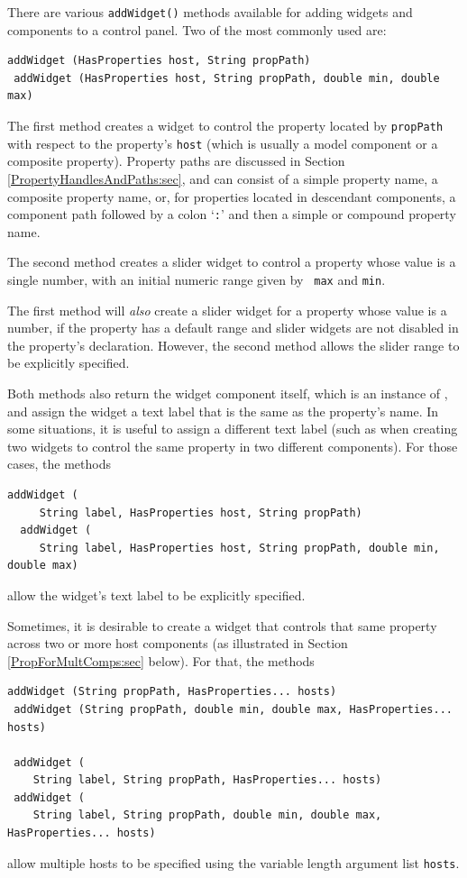 There are various {\tt addWidget()} methods available for adding
widgets and components to a control panel. Two of the most commonly
used are:
\begin{lstlisting}[]
 addWidget (HasProperties host, String propPath)
 addWidget (HasProperties host, String propPath, double min, double max)
\end{lstlisting}
%
The first method creates a widget to control the property located by
{\tt propPath} with respect to the property's {\tt host} (which is
usually a model component or a composite property).  Property paths
are discussed in Section
\ref{PropertyHandlesAndPaths:sec}, and can consist of a
simple property name, a composite property name, or, for properties
located in descendant components, a component path followed by a colon
`{\tt :}' and then a simple or compound property name.  

The second method creates a slider widget to control a property whose
value is a single number, with an initial numeric range given by {\tt
max} and {\tt min}.

\begin{sideblock}
The first method will {\it also} create a slider widget for a property
whose value is a number, if the property has a default range and
slider widgets are not disabled in the property's
declaration. However, the second method allows the slider range to be
explicitly specified.
\end{sideblock}

Both methods also return the widget component itself,
which is an instance of
, and
assign the widget a text label that is the same as the property's
name. In some situations, it is useful to assign a different text
label (such as when creating two widgets to control the same property
in two different components). For those cases, the methods
\begin{lstlisting}[]
  addWidget (
     String label, HasProperties host, String propPath)
  addWidget (
     String label, HasProperties host, String propPath, double min, double max)
\end{lstlisting}
%
allow the widget's text label to be explicitly specified.

Sometimes, it is desirable to create a widget that controls that same
property across two or more host components (as illustrated in
Section \ref{PropForMultComps:sec} below). For that, the methods
\begin{lstlisting}[]
 addWidget (String propPath, HasProperties... hosts)
 addWidget (String propPath, double min, double max, HasProperties... hosts)

 addWidget (
    String label, String propPath, HasProperties... hosts)
 addWidget (
    String label, String propPath, double min, double max, HasProperties... hosts)
\end{lstlisting}
allow multiple hosts to be specified using the variable length
argument list {\tt hosts}.


